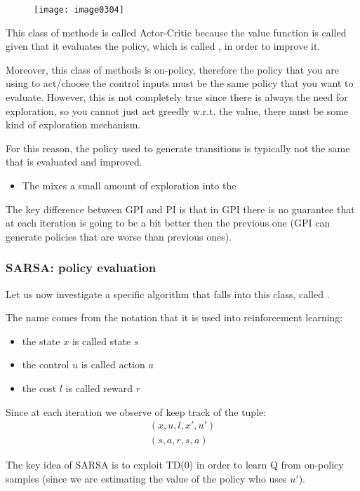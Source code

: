 \begin{figure}[!h]
\centering
\texttt{[image: image0304]}
\end{figure}

This class of methods is called Actor-Critic because the value function is called  given that it evaluates the policy, which is called , in order to improve it.

Moreover, this class of methods is on-policy, therefore the policy that you are using to act/choose the control inputs must be the same policy that you want to evaluate. However, this is not completely true since there is always the need for exploration, so you cannot just act greedly w.r.t. the value, there must be some kind of exploration mechanism.

For this reason, the policy used to generate transitions is typically not the same that is evaluated and improved.
\begin{itemize}
\item The  mixes a small amount of exploration into the 
\end{itemize}

The key difference between GPI and PI is that in GPI there is no guarantee that at each iteration is going to be a bit better then the previous one (GPI can generate policies that are worse than previous ones).

\subsubsection{SARSA: policy evaluation}
Let us now investigate a specific algorithm that falls into this class, called .

The name comes from the notation that it is used into reinforcement learning:
\begin{itemize}
\item the state $x$ is called state $s$
\item the control $u$ is called action $a$
\item the cost $l$ is called reward $r$
\end{itemize}

Since at each iteration we observe of keep track of the tuple:
\begin{gather*}
(x,u,l,x',u')\\
(s,a,r,s,a)
\end{gather*}

The key idea of SARSA is to exploit TD(0) in order to learn Q from on-policy samples (since we are estimating the value of the policy who uses $u'$).

